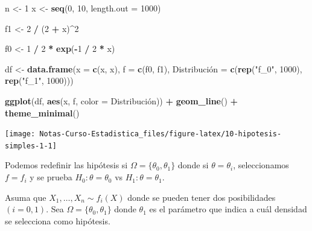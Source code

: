 \documentclass[
  12pt,
]{book}
\newenvironment{Shaded}{\begin{snugshade}}{\end{snugshade}}
\newcommand{\DataTypeTok}[1]{\textcolor[rgb]{0.13,0.29,0.53}{#1}}
\newcommand{\DecValTok}[1]{\textcolor[rgb]{0.00,0.00,0.81}{#1}}
\newcommand{\KeywordTok}[1]{\textcolor[rgb]{0.13,0.29,0.53}{\textbf{#1}}}
\newcommand{\NormalTok}[1]{#1}
\newcommand{\OperatorTok}[1]{\textcolor[rgb]{0.81,0.36,0.00}{\textbf{#1}}}
\newcommand{\StringTok}[1]{\textcolor[rgb]{0.31,0.60,0.02}{#1}}
\begin{document}
\begin{Shaded}
\begin{Highlighting}[]
\NormalTok{n \textless{}{-}}\StringTok{ }\DecValTok{1}
\NormalTok{x \textless{}{-}}\StringTok{ }\KeywordTok{seq}\NormalTok{(}\DecValTok{0}\NormalTok{, }\DecValTok{10}\NormalTok{, }\DataTypeTok{length.out =} \DecValTok{1000}\NormalTok{)}

\NormalTok{f1 \textless{}{-}}\StringTok{  }\DecValTok{2} \OperatorTok{/}\StringTok{ }\NormalTok{(}\DecValTok{2} \OperatorTok{+}\StringTok{ }\NormalTok{x)}\OperatorTok{\^{}}\DecValTok{2}

\NormalTok{f0 \textless{}{-}}\StringTok{ }\DecValTok{1} \OperatorTok{/}\StringTok{ }\DecValTok{2} \OperatorTok{*}\StringTok{ }\KeywordTok{exp}\NormalTok{(}\OperatorTok{{-}}\DecValTok{1} \OperatorTok{/}\StringTok{ }\DecValTok{2} \OperatorTok{*}\StringTok{ }\NormalTok{x)}

\NormalTok{df \textless{}{-}}\StringTok{ }\KeywordTok{data.frame}\NormalTok{(}\DataTypeTok{x =} \KeywordTok{c}\NormalTok{(x, x), }\DataTypeTok{f =} \KeywordTok{c}\NormalTok{(f0, f1), }\StringTok{\textasciigrave{}}\DataTypeTok{Distribución}\StringTok{\textasciigrave{}}\NormalTok{ =}\StringTok{ }\KeywordTok{c}\NormalTok{(}\KeywordTok{rep}\NormalTok{(}\StringTok{"f\_0"}\NormalTok{, }\DecValTok{1000}\NormalTok{), }\KeywordTok{rep}\NormalTok{(}\StringTok{"f\_1"}\NormalTok{, }\DecValTok{1000}\NormalTok{)))}

\KeywordTok{ggplot}\NormalTok{(df, }\KeywordTok{aes}\NormalTok{(x, f, }\DataTypeTok{color =} \StringTok{\textasciigrave{}}\DataTypeTok{Distribución}\StringTok{\textasciigrave{}}\NormalTok{)) }\OperatorTok{+}
\StringTok{  }\KeywordTok{geom\_line}\NormalTok{() }\OperatorTok{+}
\StringTok{  }\KeywordTok{theme\_minimal}\NormalTok{()}
\end{Highlighting}
\end{Shaded}

\begin{center}\texttt{[image: Notas-Curso-Estadistica\_files/figure-latex/10-hipotesis-simples-1-1]} \end{center}

Podemos redefinir las hipótesis si \(\Omega=\{\theta_0,\theta_1\}\) donde si
\(\theta = \theta_i\), seleccionamos \(f = f_i\) y se prueba \(H_0: \theta=\theta_0\)
vs \(H_1:\theta=\theta_1\).

Asuma que \(X_1,\dots,X_n\sim f_i(X)\) donde se pueden tener dos posibilidades
\((i=0,1)\). Sea \(\Omega =\{\theta_0,\theta_1\}\) donde \(\theta_1\) es el parámetro
que indica a cuál densidad se selecciona como hipótesis.
\end{document}
